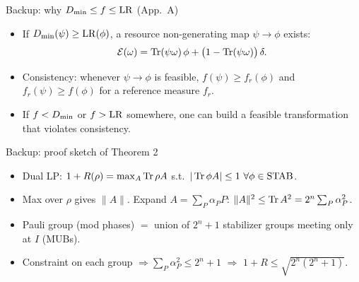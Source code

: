 
\appendix
\begin{frame}{Backup: why $D_{\min}\le f\le\mathrm{LR}$ (App.~A)}
  \small
  \begin{itemize}
    \item If $D_{\min}(\psi)\ge\mathrm{LR}(\phi)$, a resource non-generating map $\psi\to\phi$ exists:
      \[\mathcal E(\omega)=\operatorname{Tr}(\psi\omega)\,\phi+\big(1-\operatorname{Tr}(\psi\omega)\big)\,\delta .\]
    \item Consistency: whenever $\psi\to\phi$ is feasible, $f(\psi)\ge f_r(\phi)$ and $f_r(\psi)\ge f(\phi)$ for a reference measure $f_r$.
    \item If $f<D_{\min}$ or $f>\mathrm{LR}$ somewhere, one can build a feasible transformation that violates consistency.
  \end{itemize}
\end{frame}

\begin{frame}{Backup: proof sketch of Theorem 2}
  \small
  \begin{itemize}
    \item Dual LP: $1+R(\rho)=\max_A\operatorname{Tr}\rho A$ s.t.\ $|\Tr\phi A|\le1\ \forall\phi\in\STAB$.
    \item Max over $\rho$ gives $\|A\|$. Expand $A=\sum_P\alpha_PP$: $\|A\|^2\le\operatorname{Tr} A^2=2^n\sum_P\alpha_P^2$.
    \item Pauli group (mod phases) $=$ union of $2^n+1$ stabilizer groups meeting only at $I$ (MUBs).
    \item Constraint on each group $\Rightarrow\sum_P\alpha_P^2\le2^n+1$ $\Rightarrow$ $1+R\le\sqrt{2^n(2^n+1)}$.
  \end{itemize}
\end{frame}
